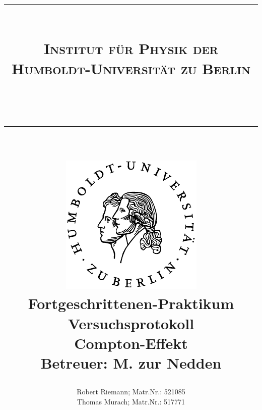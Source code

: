 \documentclass[a4paper,twocolumn,oneside,bibtotoc,smallheadings,pointlessnumbers,halfparskip,DIV15]{scrartcl}
\newcommand{\lref}[1]{Listing (\ref{lst:#1})} %
\newcommand{\eref}[1]{Gl. (\ref{eqn:#1})} %
\begin{document}
\title{{\centering \rule{15cm}{0.001cm}\\
\Large{\textsc{Institut für Physik der
Humboldt-Universität zu Berlin}}}\\ \centering \rule{15cm}{0.001cm}\\
\vspace{15mm} \centering
\includegraphics[scale=0.9]{../../assets/siegel}\\
\vspace{18mm}
{\bf{\huge{Fortgeschrittenen-Praktikum}}}\\
Versuchsprotokoll\\
\vspace{14mm}
Compton-Effekt\\
\vspace{14mm} {\small{\textbf{Betreuer: M. zur Nedden}}}\\}
\author{Robert Riemann; Matr.Nr.: 521085\\
Thomas Murach; Matr.Nr.: 517771\vspace{18mm}}
\vspace{18mm}
\onecolumn
\maketitle
\twocolumn

\tableofcontents
\listoffigures
\listoftables



% 

% 

% 
% 
% 
\end{document}
